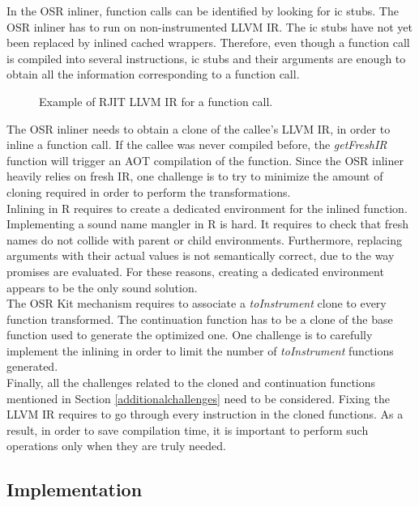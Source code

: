 In the OSR inliner, function calls can be identified by looking for ic stubs.
The OSR inliner has to run on non-instrumented LLVM IR. 
The ic stubs have not yet been replaced by inlined cached wrappers.
Therefore, even though a function call is compiled into several instructions, ic stubs and their arguments are enough to obtain all the information corresponding to a function call.\\

\begin{figure}[h]
\caption{Example of RJIT LLVM IR for a function call.}
\label{fig:functioncall}
\end{figure}


The OSR inliner needs to obtain a clone of the callee's LLVM IR, in order to inline a function call.
If the callee was never compiled before, the \textit{getFreshIR} function will trigger an AOT compilation of the function.
Since the OSR inliner heavily relies on fresh IR, one challenge is to try to minimize the amount of cloning required in order to perform the transformations.\\

Inlining in R requires to create a dedicated environment for the inlined function.
Implementing a sound name mangler in R is hard. 
It requires to check that fresh names do not collide with parent or child environments.
Furthermore, replacing arguments with their actual values is not semantically correct, due to the way promises are evaluated.
For these reasons, creating a dedicated environment appears to be the only sound solution.\\

The OSR Kit mechanism requires to associate a \textit{toInstrument} clone to every function transformed.
The continuation function has to be a clone of the base function used to generate the optimized one.
One challenge is to carefully implement the inlining in order to limit the number of \textit{toInstrument} functions generated.\\

Finally, all the challenges related to the cloned and continuation functions mentioned in Section \ref{additionalchallenges} need to be considered.
Fixing the LLVM IR requires to go through every instruction in the cloned functions.
As a result, in order to save compilation time, it is important to perform such operations only when they are truly needed.\\

\subsection{Implementation}

